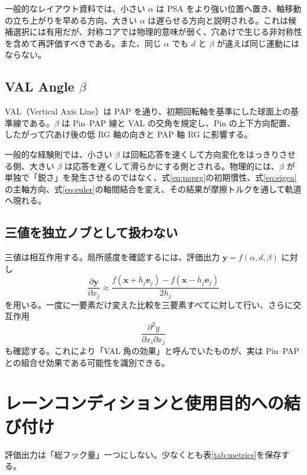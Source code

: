 \documentclass[11pt,a4paper]{article}
\newcommand{\vect}[1]{\bm{#1}}
\begin{document}
一般的なレイアウト資料では、小さい $\alpha$ は PSA をより強い位置へ置き、軸移動の立ち上がりを早める方向、大きい $\alpha$ は遅らせる方向と説明される\cite{morrich,radical_layouts}。これは候補選択には有用だが、対称コアでは物理的意味が弱く、穴あけで生じる非対称性を含めて再評価すべきである。また、同じ $\alpha$ でも $d$ と $\beta$ が違えば同じ運動にはならない。

\subsection{VAL Angle $\beta$}

VAL（Vertical Axis Line）は PAP を通り、初期回転軸を基準にした球面上の基準線である。$\beta$ は Pin--PAP 線と VAL の交角を規定し、Pin の上下方向配置、したがって穴あけ後の低 RG 軸の向きと PAP 軸 RG に影響する。

一般的な経験則では、小さい $\beta$ は回転応答を速くして方向変化をはっきりさせる側、大きい $\beta$ は応答を遅くして滑らかにする側とされる\cite{morrich,radical_layouts}。物理的には、$\beta$ が単独で「鋭さ」を発生させるのではなく、式\eqref{eq:paprg}の初期慣性、式\eqref{eq:eigen}の主軸方向、式\eqref{eq:euler}の軸間結合を変え、その結果が摩擦トルクを通して軌道へ現れる。

\subsection{三値を独立ノブとして扱わない}

三値は相互作用する。局所感度を確認するには、評価出力 $\vect y=f(\alpha,d,\beta)$ に対し
\begin{equation}
 \frac{\partial\vect y}{\partial x_j}
 \approx
 \frac{f(\vect x+h_j\vect e_j)-f(\vect x-h_j\vect e_j)}{2h_j}
 \label{eq:finite}
\end{equation}
を用いる。一度に一要素だけ変えた比較を三要素すべてに対して行い、さらに交互作用
\begin{equation}
 \frac{\partial^2 y}{\partial x_i\partial x_j}
\end{equation}
も確認する。これにより「VAL 角の効果」と呼んでいたものが、実は Pin--PAP との組合せ効果である可能性を識別できる。

\section{レーンコンディションと使用目的への結び付け}

評価出力は「総フック量」一つにしない。少なくとも表\ref{tab:metrics}を保存する。
\end{document}
